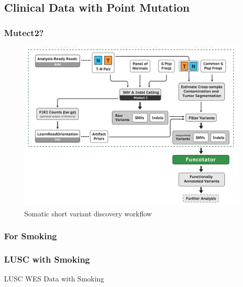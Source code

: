 \documentclass{beamer}
\begin{document}
    \subsection{Clinical Data with Point Mutation}
    \begin{frame}
        \frametitle{Mutect2?}

        \begin{figure}
            \includegraphics[width=0.6 \linewidth]{figures/Workflow/somatic_short_variants.png}
            \caption{Somatic short variant discovery workflow \protect\cite{gatk1, gatk2}}
        \end{figure}
    \end{frame}

    \subsubsection{For Smoking}
    \begin{frame}
        \frametitle{LUSC with Smoking}

        \begin{table}
            \caption{LUSC WES Data with Smoking}
            \resizebox{!}{0.3 \textheight}
            {}
        \end{table}
    \end{frame}
\end{document}
